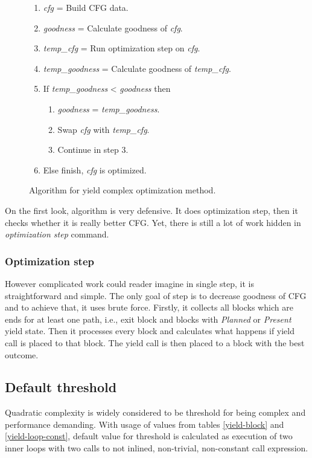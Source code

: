 \begin{figure}[h!]
\caption{Algorithm for yield complex optimization method.}
\begin{enumerate}
\item{\emph{cfg} = Build CFG data.}
\item{\emph{goodness} = Calculate goodness of \emph{cfg}.}
\item{\emph{temp\_cfg} = Run optimization step on \emph{cfg}.}
\item{\emph{temp\_goodness} = Calculate goodness of \emph{temp\_cfg}.}
\item{If \emph{temp\_goodness} < \emph{goodness} then}
	\begin{enumerate}[label=5.\arabic*.]
	\item{\emph{goodness} = \emph{temp\_goodness}.}
	\item{Swap \emph{cfg} with \emph{temp\_cfg}.}
	\item{Continue in step 3.}
	\end{enumerate}
\item{Else finish, \emph{cfg} is optimized.}
\end{enumerate}
\end{figure}

On the first look, algorithm is very defensive. It does optimization step, then it checks whether it is really better CFG. Yet, there is still a lot of work hidden in \emph{optimization step} command.

\subsubsection{Optimization step}
However complicated work could reader imagine in single step, it is straightforward and simple. The only goal of step is to decrease goodness of CFG and to achieve that, it uses brute force. Firstly, it collects all blocks which are ends for at least one path, i.e., exit block and blocks with \emph{Planned} or \emph{Present} yield state. Then it processes every block and calculates what happens if yield call is placed to that block. The yield call is then placed to a block with the best outcome.

\subsection{Default threshold}
\label{yield-default}
Quadratic complexity is widely considered to be threshold for being complex and performance demanding. With usage of values from tables \ref{yield-block} and \ref{yield-loop-const}, default value for threshold is calculated as execution of two inner  loops with two calls to not inlined, non-trivial, non-constant call expression.

